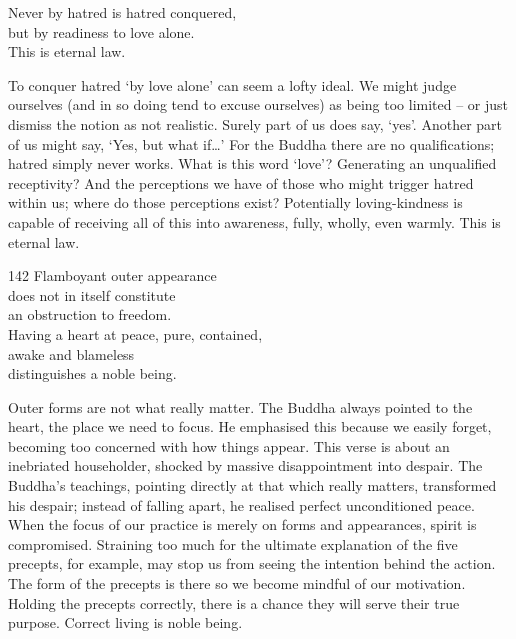 
\begin{dhpVerse}{5}
\label{dhp-5}
Never by hatred is hatred conquered,\\
but by readiness to love alone.\\
This is eternal law.
\end{dhpVerse}

\begin{dhpRefl}

To conquer hatred `by love alone' can seem a lofty ideal. We might
judge ourselves (and in so doing tend to excuse ourselves) as being
too limited -- or just dismiss the notion as not realistic. Surely
part of us does say, `yes'. Another part of us might say, `Yes, but
what if\ldots{}' For the Buddha there are no qualifications;
hatred simply never works. What is this word `love'? Generating an
unqualified receptivity? And the perceptions we have of those who
might trigger hatred within us; where do those perceptions exist?
Potentially loving-kindness is capable of receiving all of this into
awareness, fully, wholly, even warmly. This is eternal law.

\end{dhpRefl}


\begin{dhpVerse}{142}
\label{dhp-142}
Flamboyant outer appearance\\
does not in itself constitute\\
an obstruction to freedom.\\
Having a heart at peace, pure, contained,\\
awake and blameless\\
distinguishes a noble being.
\end{dhpVerse}

\begin{dhpRefl}

Outer forms are not what really matter. The Buddha always pointed to
the heart, the place we need to focus. He emphasised this because we
easily forget, becoming too concerned with how things appear. This
verse is about an inebriated householder, shocked by massive
disappointment into despair. The Buddha's teachings, pointing
directly at that which really matters, transformed his despair;
instead of falling apart, he realised perfect unconditioned peace.
When the focus of our practice is merely on forms and appearances,
spirit is compromised. Straining too much for the ultimate
explanation of the five precepts, for example, may stop us from
seeing the intention behind the action. The form of the precepts is
there so we become mindful of our motivation. Holding the precepts
correctly, there is a chance they will serve their true purpose.
Correct living is noble being.

\end{dhpRefl}

